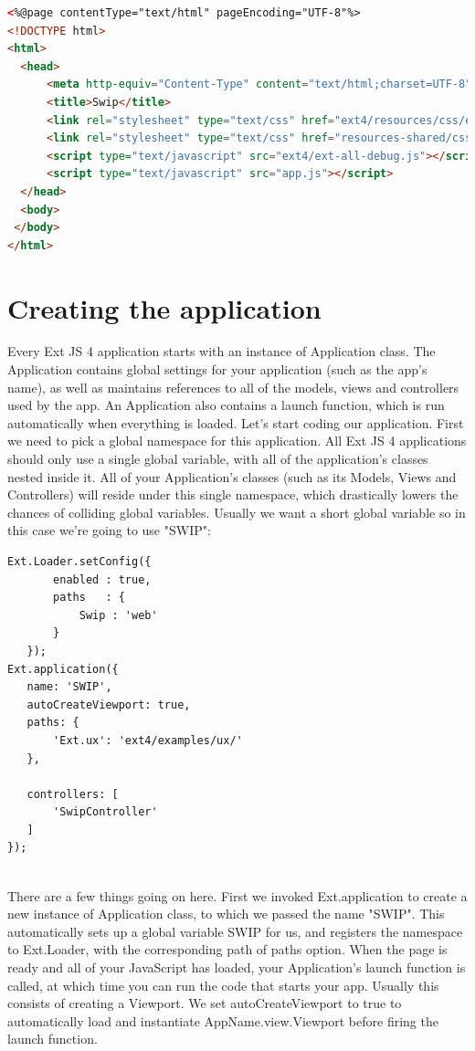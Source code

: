 \begin{lstlisting}[language=HTML] 
<%@page contentType="text/html" pageEncoding="UTF-8"%>
<!DOCTYPE html>
<html>
  <head>
      <meta http-equiv="Content-Type" content="text/html;charset=UTF-8">
      <title>Swip</title>
      <link rel="stylesheet" type="text/css" href="ext4/resources/css/ext-all.css">
      <link rel="stylesheet" type="text/css" href="resources-shared/css/swip.css">
      <script type="text/javascript" src="ext4/ext-all-debug.js"></script>
      <script type="text/javascript" src="app.js"></script>          
  </head>
  <body>
 </body>
</html>
\end{lstlisting}

\section{Creating the application}
\par Every Ext JS 4 application starts with an instance of Application class. The Application contains global settings for your application (such as the app's name), as well as maintains references to all of the models, views and controllers used by the app. An Application also contains a launch function, which is run automatically when everything is loaded. 
Let's start coding our application. First we need to pick a global namespace for this application. All Ext JS 4 applications should only use a single global variable, with all of the application's classes nested inside it. All of your Application's classes (such as its Models, Views and Controllers) will reside under this single namespace, which drastically lowers the chances of colliding global variables. Usually we want a short global variable so in this case we're going to use "SWIP":\\
\begin{lstlisting}[language=HTML]
Ext.Loader.setConfig({
       enabled : true,
       paths   : {
           Swip : 'web'
       } 
   });
Ext.application({
   name: 'SWIP',
   autoCreateViewport: true,
   paths: {
       'Ext.ux': 'ext4/examples/ux/' 
   },
   
   controllers: [
       'SwipController'
   ]
});
	
\end{lstlisting}


\par There are a few things going on here. First we invoked Ext.application to create a new instance of Application class, to which we passed the name "SWIP". This automatically sets up a global variable SWIP for us, and registers the namespace to Ext.Loader, with the corresponding path of paths option. 
When the page is ready and all of your JavaScript has loaded, your Application's launch function is called, at which time you can run the code that starts your app. Usually this consists of creating a Viewport. We set autoCreateViewport to true to automatically load and instantiate AppName.view.Viewport before firing the launch function. \\

